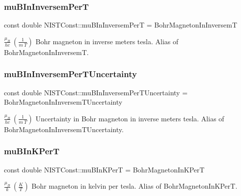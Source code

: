 \subsubsection{\texorpdfstring{mu\+B\+In\+Inversem\+PerT}{muBInInversemPerT}}
{\footnotesize\ttfamily const double N\+I\+S\+T\+Const\+::mu\+B\+In\+Inversem\+PerT = Bohr\+Magneton\+In\+InversemT}

$\frac{\mu_B}{hc} \ (\frac{1}{m\ T})$ Bohr magneton in inverse meters tesla. Alias of Bohr\+Magneton\+In\+InversemT. \mbox{\label{group___n_i_s_t_const-_bohr_magneton_ga51cabaa66ef3fd011187bc9ad5226cc8}} 
\subsubsection{\texorpdfstring{mu\+B\+In\+Inversem\+Per\+T\+Uncertainty}{muBInInversemPerTUncertainty}}
{\footnotesize\ttfamily const double N\+I\+S\+T\+Const\+::mu\+B\+In\+Inversem\+Per\+T\+Uncertainty = Bohr\+Magneton\+In\+Inversem\+T\+Uncertainty}

$\frac{\mu_B}{hc} \ (\frac{1}{m\ T})$ Uncertainty in Bohr magneton in inverse meters tesla. Alias of Bohr\+Magneton\+In\+Inversem\+T\+Uncertainty. \mbox{\label{group___n_i_s_t_const-_bohr_magneton_ga51473ab154d1c4e8e9afca84952db156}} 
\subsubsection{\texorpdfstring{mu\+B\+In\+K\+PerT}{muBInKPerT}}
{\footnotesize\ttfamily const double N\+I\+S\+T\+Const\+::mu\+B\+In\+K\+PerT = Bohr\+Magneton\+In\+K\+PerT}

$\frac{\mu_B}{k} \ (\frac{K}{T})$ Bohr magneton in kelvin per tesla. Alias of Bohr\+Magneton\+In\+K\+PerT. \mbox{\label{group___n_i_s_t_const-_bohr_magneton_ga3e329894e17506d60948fd563cee0368}} 
